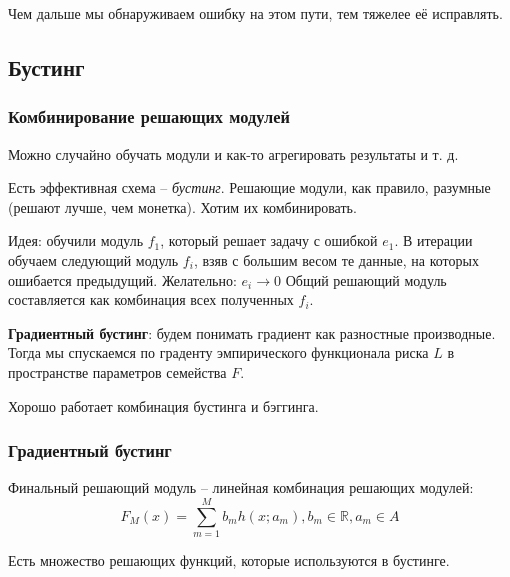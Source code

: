 \documentclass[main.tex]{subfiles}
\begin{document}
Чем дальше мы обнаруживаем ошибку на этом пути, тем тяжелее её исправлять.

\subsection{Бустинг}
\subsubsection{Комбинирование решающих модулей}

Можно случайно обучать модули и как-то агрегировать результаты и т. д.

Есть эффективная схема -- \emph{бустинг}.
Решающие модули, как правило, разумные (решают лучше, чем монетка).
Хотим их комбинировать.

Идея: обучили модуль $ f_1 $, который решает задачу с ошибкой $e_1$.
В итерации обучаем следующий модуль $f_i$, взяв с большим весом те данные, на которых ошибается предыдущий.
Желательно: $ e_i \to 0 $
Общий решающий модуль составляется как комбинация всех полученных $f_i$.

\textbf{Градиентный бустинг}: будем понимать градиент как разностные производные.
Тогда мы спускаемся по граденту эмпирического функционала риска $L$ в пространстве параметров семейства $ F $.

Хорошо работает комбинация бустинга и бэггинга.

\subsubsection{Градиентный бустинг}

Финальный решающий модуль -- линейная комбинация решающих модулей: 
$$ F_M(x) = \sum_{m=1}^{M} b_m h(x;a_m), b_m \in \mathds{R}, a_m \in A $$

Есть множество решающих функций, которые используются в бустинге.
\end{document}
